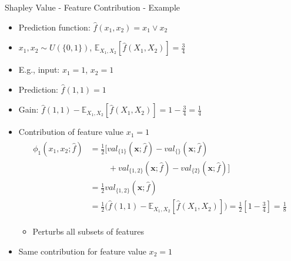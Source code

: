 \begin{frame}[shrink=5]{Shapley Value - Feature Contribution - Example}
	\begin{itemize}\setlength\itemsep{1em}
		\item Prediction function: $\hat{f}(x_1, x_2) = x_1 \lor x_2$
		\item $x_1, x_2 \sim U(\{0, 1\})$, $\mathbb{E}_{X_1,X_2}\left[\hat{f}(X_1,X_2)\right] = \frac{3}{4}$
		\item E.g., input: $x_1 = 1$, $x_2 = 1$
		\item Prediction: $\hat{f}(1, 1) = 1$
		\item Gain: $\hat{f}(1, 1) - \mathbb{E}_{X_1,X_2}\left[\hat{f}(X_1,X_2)\right] = 1 - \frac{3}{4} = \frac{1}{4}$
		\item Contribution of feature value $x_1 = 1$
		\begin{align}\begin{split}
				\phi_1\left(x_1, x_2;\hat{f}\right)
				&=\frac{1}{2} \biggl[val_{\{1\}}\left(\bm{x};\hat{f}\right)-val_{\{\}}\left(\bm{x};\hat{f}\right)\\
				&\;\;\;\;\;\;\;\;+val_{\{1,2\}}\left(\bm{x};\hat{f}\right)-val_{\{2\}}\left(\bm{x};\hat{f}\right)\biggr]\\
				&=\frac{1}{2} val_{\{1,2\}}\left(\bm{x};\hat{f}\right)\\
				&=\frac{1}{2} \biggl(\hat{f}(1, 1) - \mathbb{E}_{X_1,X_2}\left[\hat{f}(X_1,X_2)\right]\biggr)
				=\frac{1}{2} \left[1 - \frac{3}{4}\right] = \frac{1}{8}
		\end{split}\end{align}
		\vspace{-0.5em}
		\begin{itemize}
			\item Perturbs all subsets of features
		\end{itemize}
		\item Same contribution for feature value $x_2 = 1$
	\end{itemize}
\end{frame}



